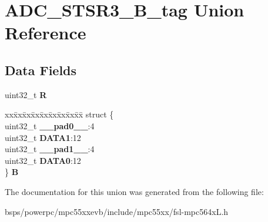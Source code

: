 \hypertarget{unionADC__STSR3__32B__tag}{}\section{A\+D\+C\+\_\+\+S\+T\+S\+R3\+\_\+B\+\_\+tag Union Reference}
\label{unionADC__STSR3__32B__tag}
\subsection*{Data Fields}
\begin{DoxyCompactItemize}
\item 
\mbox{\label{unionADC__STSR3__32B__tag_ad8c87b78c4ba557222dd5ab503dc1915}} 
uint32\+\_\+t {\bfseries R}
\item 
\mbox{\label{unionADC__STSR3__32B__tag_a68629c8a4de3d2c39863fb7f5e12b065}} 
\begin{tabbing}
xx\=xx\=xx\=xx\=xx\=xx\=xx\=xx\=xx\=\kill
struct \{\\
\>uint32\_t {\bfseries \_\_pad0\_\_}:4\\
\>uint32\_t {\bfseries DATA1}:12\\
\>uint32\_t {\bfseries \_\_pad1\_\_}:4\\
\>uint32\_t {\bfseries DATA0}:12\\
\} {\bfseries B}\\

\end{tabbing}\end{DoxyCompactItemize}


The documentation for this union was generated from the following file\+:\begin{DoxyCompactItemize}
\item 
bsps/powerpc/mpc55xxevb/include/mpc55xx/fsl-\/mpc564x\+L.\+h\end{DoxyCompactItemize}
